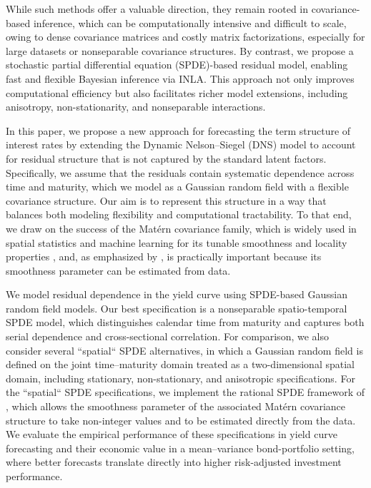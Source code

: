 \documentclass[
  12pt]{article}
\begin{document}
While such methods offer a valuable direction, they remain rooted in covariance-based inference, which can be computationally intensive and difficult to scale, owing to dense covariance matrices and costly matrix factorizations, especially for large datasets or nonseparable covariance structures. By contrast, we propose a stochastic partial differential equation (SPDE)-based residual model, enabling fast and flexible Bayesian inference via INLA. This approach not only improves computational efficiency but also facilitates richer model extensions, including anisotropy, non-stationarity, and nonseparable interactions.

In this paper, we propose a new approach for forecasting the term structure of interest rates by extending the Dynamic Nelson–Siegel (DNS) model to account for residual structure that is not captured by the standard latent factors. Specifically, we assume that the residuals contain systematic dependence across time and maturity, which we model as a Gaussian random field with a flexible covariance structure. Our aim is to represent this structure in a way that balances both modeling flexibility and computational tractability. To that end, we draw on the success of the Matérn covariance family, which is widely used in spatial statistics and machine learning for its tunable smoothness and locality properties \citep{seeger2004gaussian, van2024low}, and, as emphasized by \cite{stein1999interpolation}, is practically important because its smoothness parameter can be estimated from data. 

We model residual dependence in the yield curve using SPDE-based Gaussian random field models. Our best specification is a nonseparable spatio-temporal SPDE model, which distinguishes calendar time from maturity and captures both serial dependence and cross-sectional correlation. For comparison, we also consider several ``spatial`` SPDE alternatives, in which a Gaussian random field is defined on the joint time–maturity domain treated as a two-dimensional spatial domain, including stationary, non-stationary, and anisotropic specifications. For the ``spatial`` SPDE specifications, we implement the rational SPDE framework of \cite{bolin2024covariance}, which allows the smoothness parameter of the associated Matérn covariance structure to take non-integer values and to be estimated directly from the data. We evaluate the empirical performance of these specifications in yield curve forecasting and their economic value in a mean–variance bond-portfolio setting, where better forecasts translate directly into higher risk-adjusted investment performance.
\end{document}

